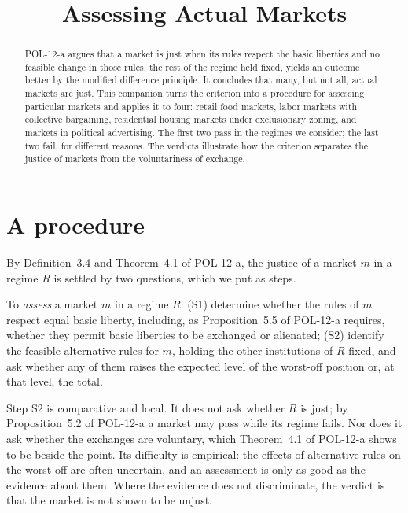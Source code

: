 \documentclass{situationist-preprint}
\title{Assessing Actual Markets}
\begin{document}
\maketitle

\begin{abstract}
POL-12-a argues that a market is just when its rules respect the basic liberties and no feasible change in those rules, the rest of the regime held fixed, yields an outcome better by the modified difference principle. It concludes that many, but not all, actual markets are just. This companion turns the criterion into a procedure for assessing particular markets and applies it to four: retail food markets, labor markets with collective bargaining, residential housing markets under exclusionary zoning, and markets in political advertising. The first two pass in the regimes we consider; the last two fail, for different reasons. The verdicts illustrate how the criterion separates the justice of markets from the voluntariness of exchange.
\end{abstract}

\section{A procedure}

By Definition~3.4 and Theorem~4.1 of POL-12-a, the justice of a market $m$ in a regime $R$ is settled by two questions, which we put as steps.

\begin{definition}\label{d:procedure}
To \emph{assess} a market $m$ in a regime $R$: (S1) determine whether the rules of $m$ respect equal basic liberty, including, as Proposition~5.5 of POL-12-a requires, whether they permit basic liberties to be exchanged or alienated; (S2) identify the feasible alternative rules for $m$, holding the other institutions of $R$ fixed, and ask whether any of them raises the expected level of the worst-off position or, at that level, the total.
\end{definition}

Step S2 is comparative and local. It does not ask whether $R$ is just; by Proposition~5.2 of POL-12-a a market may pass while its regime fails. Nor does it ask whether the exchanges are voluntary, which Theorem~4.1 of POL-12-a shows to be beside the point. Its difficulty is empirical: the effects of alternative rules on the worst-off are often uncertain, and an assessment is only as good as the evidence about them. Where the evidence does not discriminate, the verdict is that the market is not shown to be unjust.
\end{document}
